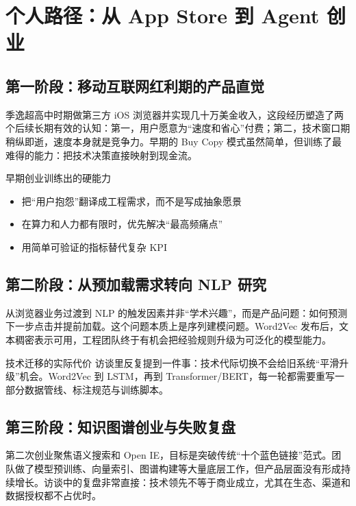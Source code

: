 \section{个人路径：从 App Store 到 Agent 创业}

\subsection{第一阶段：移动互联网红利期的产品直觉}

季逸超高中时期做第三方 iOS 浏览器并实现几十万美金收入，这段经历塑造了两个后续长期有效的认知：第一，用户愿意为“速度和省心”付费；第二，技术窗口期稍纵即逝，速度本身就是竞争力。早期的 Buy Copy 模式虽然简单，但训练了最难得的能力：把技术决策直接映射到现金流。

\begin{importantbox}{早期创业训练出的硬能力}
\begin{itemize}
    \item 把“用户抱怨”翻译成工程需求，而不是写成抽象愿景
    \item 在算力和人力都有限时，优先解决“最高频痛点”
    \item 用简单可验证的指标替代复杂 KPI
\end{itemize}
\end{importantbox}

\subsection{第二阶段：从预加载需求转向 NLP 研究}

从浏览器业务过渡到 NLP 的触发因素并非“学术兴趣”，而是产品问题：如何预测下一步点击并提前加载。这个问题本质上是序列建模问题。Word2Vec 发布后，文本稠密表示可用，工程团队终于有机会把经验规则升级为可泛化的模型能力。

\begin{knowledgebox}{技术迁移的实际代价}
访谈里反复提到一件事：技术代际切换不会给旧系统“平滑升级”机会。Word2Vec 到 LSTM，再到 Transformer/BERT，每一轮都需要重写一部分数据管线、标注规范与训练脚本。
\end{knowledgebox}

\subsection{第三阶段：知识图谱创业与失败复盘}

第二次创业聚焦语义搜索和 Open IE，目标是突破传统“十个蓝色链接”范式。团队做了模型预训练、向量索引、图谱构建等大量底层工作，但产品层面没有形成持续增长。访谈中的复盘非常直接：技术领先不等于商业成立，尤其在生态、渠道和数据授权都不占优时。

